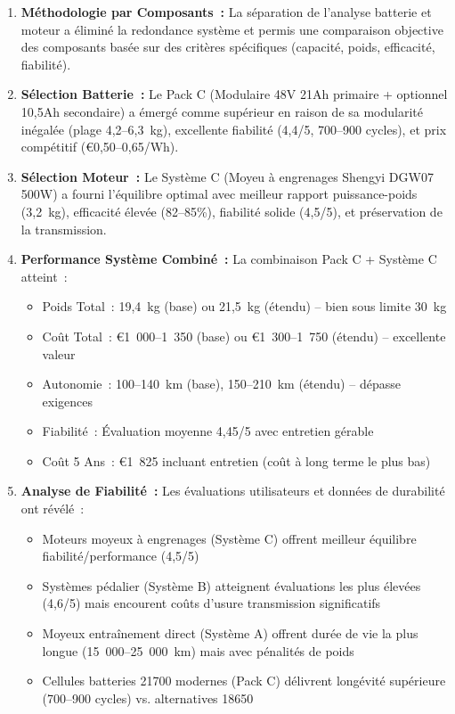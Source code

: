 \documentclass[12pt,a4paper]{article}
\begin{document}
\begin{enumerate}
    \item \textbf{Méthodologie par Composants~:} La séparation de l'analyse batterie et moteur a éliminé la redondance système et permis une comparaison objective des composants basée sur des critères spécifiques (capacité, poids, efficacité, fiabilité).
    
    \item \textbf{Sélection Batterie~:} Le Pack C (Modulaire 48V 21Ah primaire + optionnel 10,5Ah secondaire) a émergé comme supérieur en raison de sa modularité inégalée (plage 4,2--6,3~kg), excellente fiabilité (4,4/5, 700--900 cycles), et prix compétitif (€0,50--0,65/Wh).
    
    \item \textbf{Sélection Moteur~:} Le Système C (Moyeu à engrenages Shengyi DGW07 500W) a fourni l'équilibre optimal avec meilleur rapport puissance-poids (3,2~kg), efficacité élevée (82--85\%), fiabilité solide (4,5/5), et préservation de la transmission.
    
    \item \textbf{Performance Système Combiné~:} La combinaison Pack C + Système C atteint~:
    \begin{itemize}
        \item Poids Total~: 19,4~kg (base) ou 21,5~kg (étendu) -- bien sous limite 30~kg
        \item Coût Total~: €1~000--1~350 (base) ou €1~300--1~750 (étendu) -- excellente valeur
        \item Autonomie~: 100--140~km (base), 150--210~km (étendu) -- dépasse exigences
        \item Fiabilité~: Évaluation moyenne 4,45/5 avec entretien gérable
        \item Coût 5 Ans~: €1~825 incluant entretien (coût à long terme le plus bas)
    \end{itemize}
    
    \item \textbf{Analyse de Fiabilité~:} Les évaluations utilisateurs et données de durabilité ont révélé~:
    \begin{itemize}
        \item Moteurs moyeux à engrenages (Système C) offrent meilleur équilibre fiabilité/performance (4,5/5)
        \item Systèmes pédalier (Système B) atteignent évaluations les plus élevées (4,6/5) mais encourent coûts d'usure transmission significatifs
        \item Moyeux entraînement direct (Système A) offrent durée de vie la plus longue (15~000--25~000~km) mais avec pénalités de poids
        \item Cellules batteries 21700 modernes (Pack C) délivrent longévité supérieure (700--900 cycles) vs. alternatives 18650
    \end{itemize}
    

\end{enumerate}
\end{document}
